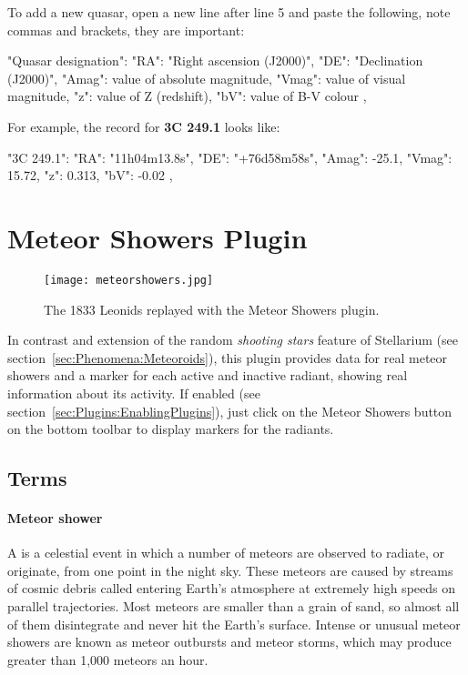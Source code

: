 To add a new quasar, open a new line after line 5 and paste the following, note commas and brackets, they are important:

\begin{configfile}
"Quasar designation":
{
    "RA": "Right ascension (J2000)",
    "DE": "Declination (J2000)",
    "Amag": value of absolute magnitude,
    "Vmag": value of visual magnitude,
    "z": value of Z (redshift),
    "bV": value of B-V colour
},
\end{configfile}

\noindent For example, the record for \textbf{3C 249.1} looks like:
\begin{configfile}
"3C 249.1":
{
    "RA": "11h04m13.8s",
    "DE": "+76d58m58s",
    "Amag": -25.1,
    "Vmag": 15.72,
    "z": 0.313,
    "bV": -0.02
},
\end{configfile}


\newpage


\section{Meteor Showers Plugin}
\label{sec:plugins:MeteorShowers}

\begin{figure}[ht]
\texttt{[image: meteorshowers.jpg]}
\label{fig:plugins:MeteorShowers}
\caption{The 1833 Leonids replayed with the Meteor Showers plugin.}
\end{figure}

\noindent In contrast and extension of the random \emph{shooting stars}
feature of Stellarium (see section~\ref{sec:Phenomena:Meteoroids}), this 
plugin provides data for real meteor showers and a marker for each 
active and inactive radiant, showing real information about its activity. 
If enabled (see section~\ref{sec:Plugins:EnablingPlugins}), just click 
on the Meteor Showers button   on the bottom
toolbar to display markers for the radiants.


\subsection{Terms}
\label{sec:plugins:MeteorShowers:terms}

\paragraph{Meteor shower}
A  is a celestial event in which a number of
meteors are observed to radiate, or originate, from one point in the
night sky. These meteors are caused by streams of cosmic debris called
 entering Earth's atmosphere at extremely high speeds on
parallel trajectories. Most meteors are smaller than a grain of sand,
so almost all of them disintegrate and never hit the Earth's
surface. Intense or unusual meteor showers are known as meteor
outbursts and meteor storms, which may produce greater than 1,000
meteors an hour.

